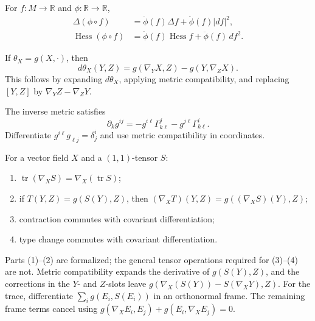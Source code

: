 \begin{remark}
  \label{rem:pet-ch2-ex-6}
  \leanok
  For $f:M\to\mathbb{R}$ and
  $\phi:\mathbb{R}\to\mathbb{R}$,
  \[
  \begin{aligned}
    \Delta(\phi\circ f)
      &=\dot\phi(f)\Delta f+\ddot\phi(f)|df|^2,\\
    \operatorname{Hess}(\phi\circ f)
      &=\dot\phi(f)\operatorname{Hess}f+\ddot\phi(f)\,df^2.
  \end{aligned}
  \]
\end{remark}

\begin{remark}
  \label{rem:pet-ch2-ex-7}
  \leanok
  If $\theta_X=g(X,\cdot)$, then
  \[
    d\theta_X(Y,Z)
      =g(\nabla_YX,Z)-g(Y,\nabla_ZX).
  \]
  \sketch
  This follows by expanding $d\theta_X$, applying metric compatibility, and
  replacing $[Y,Z]$ by $\nabla_YZ-\nabla_ZY$.
\end{remark}

\begin{remark}
  \label{rem:pet-ch2-ex-8}
  \leanok
  The inverse metric satisfies
  \[
    \partial_kg^{ij}
      =-g^{i\ell}\Gamma^j_{k\ell}
       -g^{j\ell}\Gamma^i_{k\ell}.
  \]
  \sketch
  Differentiate $g^{i\ell}g_{\ell j}=\delta^i_j$ and use metric
  compatibility in coordinates.
\end{remark}

\begin{remark}
  \label{rem:pet-ch2-ex-9}
  \leanok
  For a vector field $X$ and a $(1,1)$-tensor
  $S$:
  \begin{enumerate}
    \item $\operatorname{tr}(\nabla_XS)=\nabla_X(\operatorname{tr}S)$;
    \item if $T(Y,Z)=g(S(Y),Z)$, then
      $(\nabla_XT)(Y,Z)=g((\nabla_XS)(Y),Z)$;
    \item contraction commutes with covariant differentiation;
    \item type change commutes with covariant differentiation.
  \end{enumerate}
  Parts (1)--(2) are formalized; the general tensor operations required for
  (3)--(4) are not.
  \sketch
  Metric compatibility expands the derivative of $g(S(Y),Z)$, and the
  corrections in the $Y$- and $Z$-slots leave
  $g(\nabla_X(S(Y))-S(\nabla_XY),Z)$. For the trace, differentiate
  $\sum_i g(E_i,S(E_i))$ in an orthonormal frame. The remaining frame terms
  cancel using
  $g(\nabla_XE_i,E_j)+g(E_i,\nabla_XE_j)=0$.
\end{remark}

